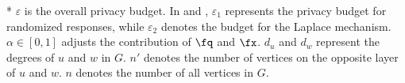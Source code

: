 \begin{table}[tbh]
\centering
\caption{Summary of time costs and expected L2 losses}
\myspace
{}
\begin{flushleft}
* $\varepsilon$ is the overall privacy budget. 
 In \advss and \advds, $\varepsilon_1$ represents the privacy budget for randomized responses, while $\varepsilon_2$ denotes the budget for the Laplace mechanism. 
 $\alpha \in [0,1]$ adjusts the contribution of $\fq$ and $\fx$. 
$d_u$ and $d_w$ represent the degrees of $u$ and $w$ in $G$. 
$n'$ denotes the number of vertices on the opposite layer of $u$ and $w$. 
$n$ denotes the number of all vertices in $G$. 
\end{flushleft}
\label{tab:complexitycompare}
\end{table}